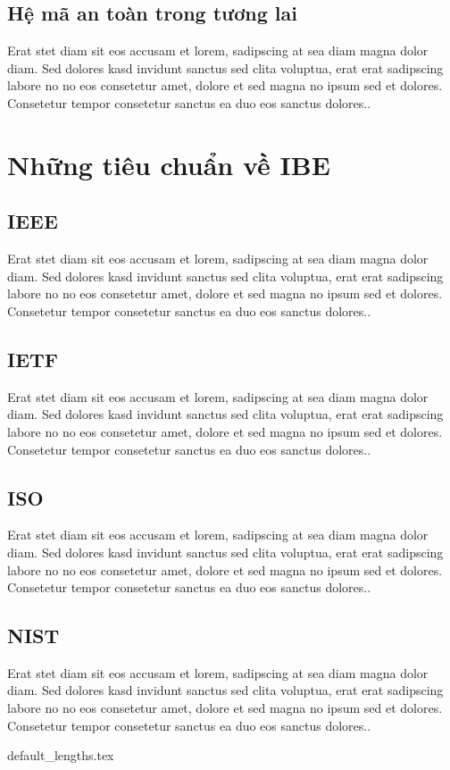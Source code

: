 \documentclass[class=report, crop=false]{standalone}
\begin{document}
		\subsection{Hệ mã an toàn trong tương lai}
			Erat stet diam sit eos accusam et lorem, sadipscing at sea diam magna dolor diam. Sed dolores kasd invidunt sanctus sed clita voluptua, erat erat sadipscing labore no no eos consetetur amet, dolore et sed magna no ipsum sed et dolores. Consetetur tempor consetetur sanctus ea duo eos sanctus dolores..
	\section{Những tiêu chuẩn về IBE}
		\subsection{IEEE}
			Erat stet diam sit eos accusam et lorem, sadipscing at sea diam magna dolor diam. Sed dolores kasd invidunt sanctus sed clita voluptua, erat erat sadipscing labore no no eos consetetur amet, dolore et sed magna no ipsum sed et dolores. Consetetur tempor consetetur sanctus ea duo eos sanctus dolores..
		\subsection{IETF}
			Erat stet diam sit eos accusam et lorem, sadipscing at sea diam magna dolor diam. Sed dolores kasd invidunt sanctus sed clita voluptua, erat erat sadipscing labore no no eos consetetur amet, dolore et sed magna no ipsum sed et dolores. Consetetur tempor consetetur sanctus ea duo eos sanctus dolores..
		\subsection{ISO}
			Erat stet diam sit eos accusam et lorem, sadipscing at sea diam magna dolor diam. Sed dolores kasd invidunt sanctus sed clita voluptua, erat erat sadipscing labore no no eos consetetur amet, dolore et sed magna no ipsum sed et dolores. Consetetur tempor consetetur sanctus ea duo eos sanctus dolores..
		\subsection{NIST}
			Erat stet diam sit eos accusam et lorem, sadipscing at sea diam magna dolor diam. Sed dolores kasd invidunt sanctus sed clita voluptua, erat erat sadipscing labore no no eos consetetur amet, dolore et sed magna no ipsum sed et dolores. Consetetur tempor consetetur sanctus ea duo eos sanctus dolores..
	

	\newpage
	{default_lengths.tex}
\end{document}
